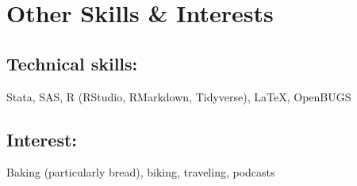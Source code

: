 \documentclass[letterpaper]{article}
\begin{document}

\section*{Other Skills \& Interests \hrulefill}

\subsection*{Technical skills:}
\hspace{0.25cm} Stata, SAS, R (RStudio, RMarkdown, Tidyverse), \LaTeX, OpenBUGS 

\subsection*{Interest:}
\hspace{0.25cm} Baking (particularly bread), biking, traveling, podcasts


\end{document}
